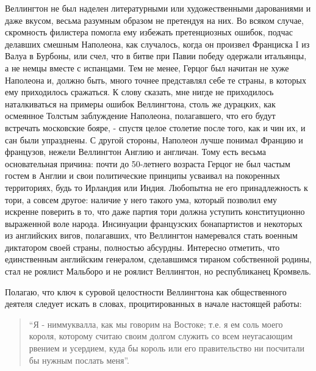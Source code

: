 \documentclass[
  oneside,
  12pt,
  titlepage]{book}
\begin{document}
Веллингтон не был наделен литературными или художественными дарованиями и даже вкусом, весьма разумным образом не претендуя на них. Во всяком случае, скромность филистера помогла ему избежать претенциозных ошибок, подчас делавших смешным Наполеона, как случалось, когда он произвел Франциска I из Валуа в Бурбоны, или счел, что в битве при Павии победу одержали итальянцы, а не немцы вместе с испанцами. Тем не менее, Герцог был начитан не хуже Наполеона и, должно быть, много точнее представлял себе те страны, в которых ему приходилось сражаться. К слову сказать, мне нигде не приходилось наталкиваться на примеры ошибок Веллингтона, столь же дурацких, как осмеянное Толстым заблуждение Наполеона, полагавшего, что его будут встречать московские бояре, - спустя целое столетие после того, как и чин их, и сан были упразднены. С другой стороны, Наполеон лучше понимал Францию и французов, нежели Веллингтон Англию и англичан. Тому есть весьма основательная причина: почти до 50-летнего возраста Герцог не был частым гостем в Англии и свои политические принципы усваивал на покоренных территориях, будь то Ирландия или Индия. Любопытна не его принадлежность к тори, а совсем другое: наличие у него такого ума, который позволил ему искренне поверить в то, что даже партия тори должна уступить конституционно выраженной воле народа. Инсинуации французских бонапартистов и некоторых из английских вигов, полагавших, что Веллингтон намеревался стать военным диктатором своей страны, полностью абсурдны. Интересно отметить, что единственным английским генералом, сделавшимся тираном собственной родины, стал не роялист Мальборо и не роялист Веллингтон, но республиканец Кромвель.

Полагаю, что ключ к суровой целостности Веллингтона как общественного деятеля следует искать в словах, процитированных в начале настоящей работы:

\begin{quote}
``Я - ниммуквалла, как мы говорим на Востоке; т.е. я ем соль моего короля, которому считаю своим долгом служить со всем неугасающим рвением и усердием, куда бы король или его правительство ни посчитали бы нужным послать меня''.
\end{quote}
\end{document}
